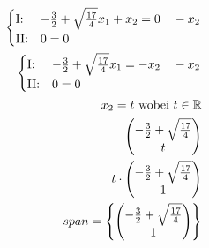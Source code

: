 \begin{align*}
    \begin{cases}
        \text{I:\@}  & -\frac{3}{2} + \sqrt{\frac{17}{4}}x_1 + x_2 = 0 \quad -x_2 \\
        \text{II:\@} & 0 = 0
    \end{cases} \\
    \begin{cases}
        \text{I:\@}  & -\frac{3}{2} + \sqrt{\frac{17}{4}}x_1 = -x_2 \quad -x_2 \\
        \text{II:\@} & 0 = 0
    \end{cases}    \\
    x_2 = t \text{ wobei } t \in \mathbb{R}                                              \\
    \begin{pmatrix}
        -\frac{3}{2} + \sqrt{\frac{17}{4}} \\ t
    \end{pmatrix}                                    \\
    t \cdot \begin{pmatrix}
                -\frac{3}{2} + \sqrt{\frac{17}{4}} \\ 1
            \end{pmatrix}                            \\
    span = \left\{\begin{pmatrix}
                      -\frac{3}{2} + \sqrt{\frac{17}{4}} \\ 1
                  \end{pmatrix}\right\}
\end{align*}